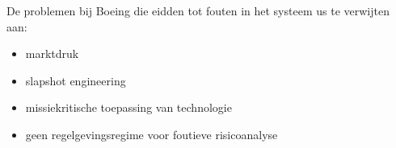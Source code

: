 \documentclass{article}
\begin{document}
	De problemen bij Boeing die eidden tot fouten in het systeem us te verwijten  aan:
	\begin{itemize}
		\item marktdruk %
		\item slapshot engineering
		\item missiekritische toepassing van technologie%
		\item geen regelgevingsregime voor foutieve risicoanalyse %
	\end{itemize}
	
\end{document}
